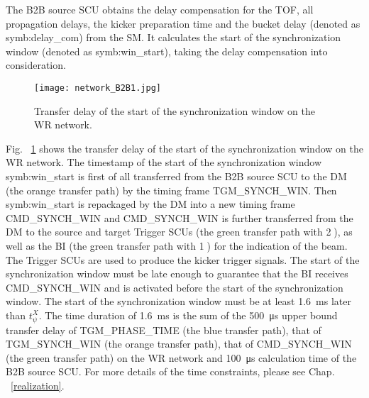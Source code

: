 The B2B source SCU obtains the delay compensation for the TOF, all propagation delays, the kicker preparation time and the bucket delay (denoted as \gls{symb:delay_com}) from the SM. It calculates the start of the synchronization window (denoted as \gls{symb:win_start}), taking the delay compensation into consideration. 

 \begin{figure}[H]
   \centering   
   \texttt{[image: network\_B2B1.jpg]}
   \caption{Transfer delay of the start of the synchronization window on the WR network.}
   \label{network_B2B1}
\end{figure}
Fig. ~\ref{network_B2B1} shows the transfer delay of the start of the synchronization window on the WR network. The timestamp of the start of the synchronization window \gls{symb:win_start} is first of all transferred from the B2B source SCU to the DM (the orange transfer path) by the timing frame TGM\_SYNCH\_WIN. Then \gls{symb:win_start} is repackaged by the DM into a new timing frame CMD\_SYNCH\_WIN and CMD\_SYNCH\_WIN is further transferred from the DM to the source and target Trigger SCUs  (the green transfer path with \textcircled{2}), as well as the BI (the green transfer path with \textcircled{1}) for the indication of the beam. The Trigger SCUs are used to produce the kicker trigger signals. The start of the synchronization window must be late enough to guarantee that the BI receives CMD\_SYNCH\_WIN and is activated before the start of the synchronization window. The start of the synchronization window must be at least \SI{1.6}{\ms} later than $t_\psi^\mathit{X}$. The time duration of \SI{1.6}{\ms} is the sum of the \SI{500}{\us} upper bound transfer delay of TGM\_PHASE\_TIME (the blue transfer path), that of TGM\_SYNCH\_WIN (the orange transfer path), that of CMD\_SYNCH\_WIN (the green transfer path) on the WR network and \SI{100}{\us} calculation time of the B2B source SCU. For more details of the time constraints, please see Chap. ~\ref{realization}.

